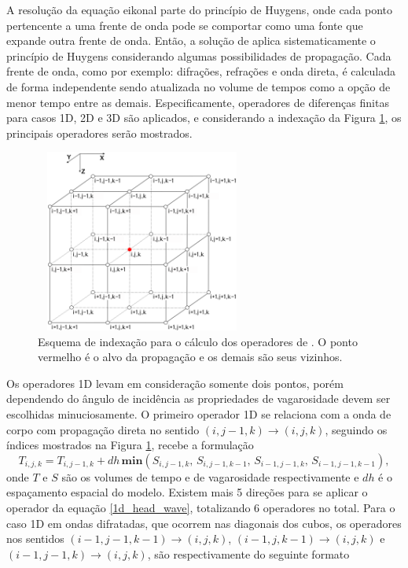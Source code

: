 A resolução da equação eikonal parte do princípio de Huygens, onde cada ponto pertencente a uma frente de onda pode se comportar como uma fonte que expande outra frente de onda. Então, a solução de  aplica sistematicamente o princípio de Huygens considerando algumas possibilidades de propagação. Cada frente de onda, como por exemplo: difrações, refrações e onda direta, é calculada de forma independente sendo atualizada no volume de tempos como a opção de menor tempo entre as demais. Especificamente, operadores de diferenças finitas para casos 1D, 2D e 3D são aplicados, e considerando a indexação da Figura \ref{fig:voxel_full}, os principais operadores serão mostrados. 
\begin{figure}[H]
	\centering
	\includegraphics[width = 7cm, height = 6cm]{Imgs/RevisaoBibliografica/voxel_full.png}
	\caption{Esquema de indexação para o cálculo dos operadores de . O ponto vermelho é o alvo da propagação e os demais são seus vizinhos.}
	\label{fig:voxel_full}
\end{figure}
Os operadores 1D levam em consideração somente dois pontos, porém dependendo do ângulo de incidência as propriedades de vagarosidade devem ser escolhidas minuciosamente. O primeiro operador 1D se relaciona com a onda de corpo com propagação direta no sentido $(i,j-1,k) \to (i,j,k)$, seguindo os índices mostrados na Figura \ref{fig:voxel_full}, recebe a formulação
\begin{equation}
	T_{i,j,k} = T_{i,j-1,k} + dh\, \mathbf{min}(S_{i,j-1,k},\, S_{i,j-1,k-1},\, S_{i-1,j-1,k},\, S_{i-1,j-1,k-1}),
	\label{1d_head_wave}
\end{equation}   
\noindent onde $T$ e $S$ são os volumes de tempo e de vagarosidade respectivamente e $dh$ é o espaçamento espacial do modelo. Existem mais 5 direções para se aplicar o operador da equação \ref{1d_head_wave}, totalizando 6 operadores no total. Para o caso 1D em ondas difratadas, que ocorrem nas diagonais dos cubos, os operadores nos sentidos $(i-1,j-1,k-1) \to (i,j,k)$, $(i-1,j,k-1) \to (i,j,k)$ e $(i-1,j-1,k) \to (i,j,k)$, são respectivamente do seguinte formato
